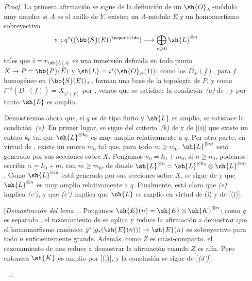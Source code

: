 \documentclass[oneside,10pt]{amsart}
\makeatletter
\renewcommand{\geq}{\geqslant}
\newcommand{\ega@arrow}[2]{\mathchoice{#1}{#2}{#2}{#2}}
\renewcommand{\to}{\ega@arrow{\longrightarrow}{\rightarrow}}
\newcommand{\oldpage}[2][]{\marginnote{\normalfont\footnotesize\textbf{#1}~|~#2}\ignorespaces}
\let\EGAOriginalLabel\label
\renewcommand{\label}[1]{\phantomsection\EGAOriginalLabel{#1}}
\makeatother
\begin{document}
\begin{proof}
La primera afirmación se sigue de la definición  de un $\sh{O}_X$-módulo muy amplio:
si $A$ es el anillo de $Y$, existen un $A$-módulo $E$ y un homomorfismo sobreyectivo
\[
  \psi:q^*((\bb{S}(E))^{\supertilde})\to\bigoplus_{n\geq0}\sh{L}^{\otimes n}
\]
tales que $i=r_{\sh{L},\psi}$ es una inmersión definida en todo punto $X\to P=\bb{P}(\widetilde{E})$ y $\sh{L}=i^*(\sh{O}_P(1))$;
como los $D_+(f)$, para $f$ homogéneo en $(\bb{S}(E))_+$, forman una base de la topología de $P$, y como $i^{-1}(D_+(f))=X_{\psi^\flat(f)}$ por , vemos que se satisface la condición~\emph{(a)} de , y por tanto $\sh{L}$ es amplio.

Demostremos ahora que, si $q$ es de tipo finito y $\sh{L}$ es amplio, se satisface la condición~\emph{(e)}.
En primer lugar, se sigue del criterio~\emph{(b)} de  y de [(i)] que existe
\oldpage[II]{87}
un entero $k_0$ tal que $\sh{L}^{\otimes k_0}$ es muy amplio relativamente a $q$.
Por otra parte, en virtud de , existe un entero $m_0$ tal que, para todo $m\geq m_0$, $\sh{L}^{\otimes m}$ está generado por sus secciones sobre $X$.
Pongamos $n_0=k_0+m_0$;
si $n\geq n_0$, podemos escribir $n=k_0+m$, con $m\geq m_0$, de donde $\sh{L}^{\otimes n}=\sh{L}^{\otimes k_0}\otimes\sh{L}^{\otimes m}$.
Como $\sh{L}^{\otimes m}$ está generado por sus secciones sobre $X$, se sigue de  y  que $\sh{L}^{\otimes n}$ es muy amplio relativamente a $q$.
Finalmente, está claro que \emph{(e)} implica \emph{(e')}, y que \emph{(e')} implica que $\sh{L}$ es amplio en virtud de (i) y de [(i)].

  \begin{env}[4.5.10.1]
  \label{II.4.5.10.1}
  [\emph{Demostración del lema}~].
  Pongamos $\sh{E}(n)=\sh{E}\otimes\sh{K}^{\otimes n}$;
  como $g$ es separado , el razonamiento de  se aplica y reduce la afirmación a demostrar que el homomorfismo canónico $g^*(g_*(\sh{E}(n)))\to\sh{E}(n)$ es sobreyectivo para todo $n$ suficientemente grande.
  Además, como $Z$ es cuasi-compacto, el razonamiento de  nos reduce a demostrar la afirmación cuando $Z$ es afín.
  Pero entonces $\sh{K}$ es amplio por [(i)], y la conclusión se sigue de [\emph{(d')}].
  \end{env}
\end{proof}
\end{document}
